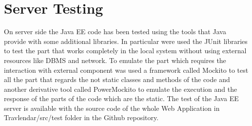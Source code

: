 \documentclass[numbers=noenddot, 12pt, a4paper, oneside]{scrbook}
\begin{document}
\section*{Server Testing}
On server side the Java EE code has been tested using the tools that Java provide with some additional libraries. In particular were used the JUnit libraries to test the part that works completely in the local system without using external resources like DBMS and network.
To emulate the part which requires the interaction with external component was used a framework called Mockito to test all the part that regards the not static classes and methods of the code and another derivative tool called PowerMockito to emulate the execution and the response of the parts of the code which are the static. 
The test of the Java EE server is available with the source code of the whole Web Application in Travlendar/src/test folder in the Github repository. \\\newline
\end{document}
